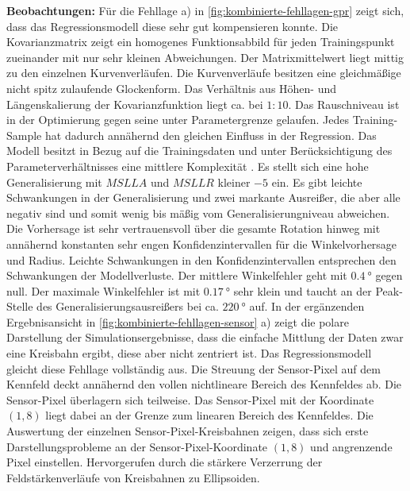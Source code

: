 \textbf{Beobachtungen:} Für die Fehllage a) in \autoref{fig:kombinierte-fehllagen-gpr} zeigt sich, dass das Regressionsmodell diese sehr gut kompensieren konnte. Die Kovarianzmatrix zeigt ein homogenes Funktionsabbild für jeden Trainingspunkt zueinander mit nur sehr kleinen Abweichungen. Der Matrixmittelwert liegt mittig zu den einzelnen Kurvenverläufen. Die Kurvenverläufe besitzen eine gleichmäßige nicht spitz zulaufende Glockenform. Das Verhältnis aus Höhen- und Längenskalierung der Kovarianzfunktion liegt ca. bei $1:10$. Das Rauschniveau ist in der Optimierung gegen seine unter Parametergrenze gelaufen. Jedes Training-Sample hat dadurch annähernd den gleichen Einfluss in der Regression. Das Modell besitzt in Bezug auf die Trainingsdaten und unter Berücksichtigung des Parameterverhältnisses eine mittlere Komplexität \cite{Rasmussen2006}. Es stellt sich eine hohe Generalisierung mit $MSLLA$ und $MSLLR$ kleiner $-5$ ein. Es gibt leichte Schwankungen in der Generalisierung und zwei markante Ausreißer, die aber alle negativ sind und somit wenig bis mäßig vom Generalisierungniveau abweichen. Die Vorhersage ist sehr vertrauensvoll über die gesamte Rotation hinweg mit annähernd konstanten sehr engen Konfidenzintervallen für die Winkelvorhersage und Radius. Leichte Schwankungen in den Konfidenzintervallen entsprechen den Schwankungen der Modellverluste. Der mittlere Winkelfehler geht mit $\SI{0,4}{\degree}$ gegen null. Der maximale Winkelfehler ist mit $\SI{0,17}{\degree}$ sehr klein und taucht an der Peak-Stelle des Generalisierungsausreißers bei ca. $\SI{220}{\degree}$ auf. In der ergänzenden Ergebnisansicht in \autoref{fig:kombinierte-fehllagen-sensor} a) zeigt die polare Darstellung der Simulationsergebnisse, dass die einfache Mittlung der Daten zwar eine Kreisbahn ergibt, diese aber nicht zentriert ist. Das Regressionsmodell gleicht diese Fehllage vollständig aus. Die Streuung der Sensor-Pixel auf dem Kennfeld deckt annähernd den vollen nichtlineare Bereich des Kennfeldes ab. Die Sensor-Pixel überlagern sich teilweise. Das Sensor-Pixel mit der Koordinate $(1,8)$ liegt dabei an der Grenze zum linearen Bereich des Kennfeldes. Die Auswertung der einzelnen Sensor-Pixel-Kreisbahnen zeigen, dass sich erste Darstellungsprobleme an der Sensor-Pixel-Koordinate $(1,8)$ und angrenzende Pixel einstellen. Hervorgerufen durch die stärkere Verzerrung der Feldstärkenverläufe von Kreisbahnen zu Ellipsoiden.
\newline
